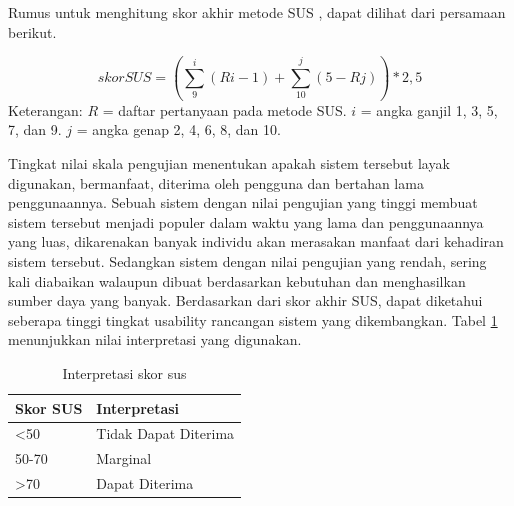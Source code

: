 Rumus untuk menghitung skor akhir metode SUS \citep{brooke1996sus}, dapat dilihat dari persamaan berikut.

\begin{equation}
skorSUS = (\sum_{9}^{i} (Ri - 1) + \sum_{10}^{j} (5 - Rj)) * 2,5
\end{equation}
\newline
Keterangan:\newline
$R$ = daftar pertanyaan pada metode SUS. \newline
$i$ = angka ganjil 1, 3, 5, 7, dan 9. \newline
$j$ = angka genap 2, 4, 6, 8, dan 10.
\newline 

\par Tingkat nilai skala pengujian menentukan apakah sistem tersebut layak digunakan, bermanfaat, diterima oleh pengguna dan bertahan lama penggunaannya. Sebuah sistem dengan nilai pengujian yang tinggi membuat sistem tersebut menjadi populer dalam waktu yang lama dan penggunaannya yang luas, dikarenakan banyak individu akan merasakan manfaat dari kehadiran sistem tersebut. Sedangkan sistem dengan nilai pengujian yang rendah, sering kali diabaikan walaupun dibuat berdasarkan kebutuhan dan menghasilkan sumber daya yang banyak.
Berdasarkan dari skor akhir SUS, dapat diketahui seberapa tinggi tingkat usability rancangan sistem yang dikembangkan. Tabel \ref{tab:skor_SUS} menunjukkan nilai interpretasi yang digunakan.

\begin{table}[H]
\caption{ Interpretasi skor sus}
\label{tab:skor_SUS}
\centering
\begin{tabular}{|l|l|}
\hline
Skor SUS         & Interpretasi         \\ \hline
\textless{}50    & Tidak Dapat Diterima \\ \hline
50-70            & Marginal             \\ \hline
\textgreater{}70 & Dapat Diterima       \\ \hline
\end{tabular}
\end{table}

